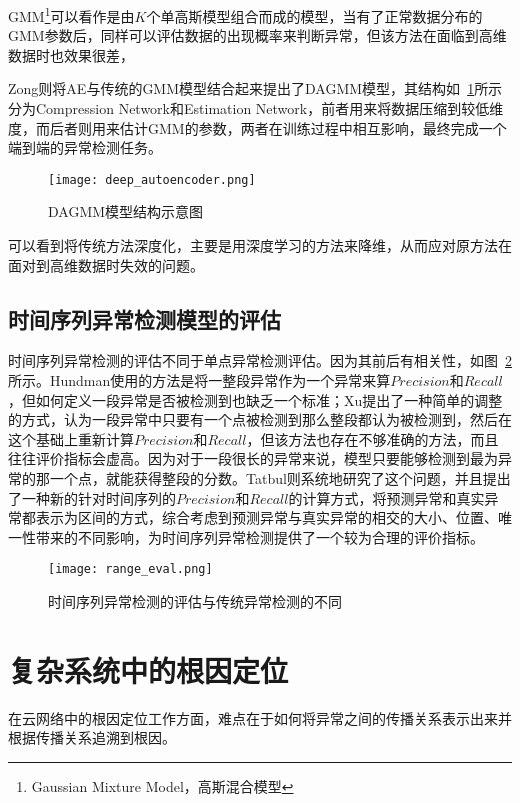 GMM\footnote{Gaussian Mixture Model，高斯混合模型}\cite{reynolds2009gaussian}可以看作是由$K$个单高斯模型组合而成的模型，当有了正常数据分布的GMM参数后，同样可以评估数据的出现概率来判断异常，但该方法在面临到高维数据时也效果很差，{Zong\cite{zong2018deep}则将AE与传统的GMM模型结合起来提出了DAGMM模型，其结构如~\ref{fig:deep:autoencoder}所示分为Compression Network和Estimation Network，前者用来将数据压缩到较低维度，而后者则用来估计GMM的参数，两者在训练过程中相互影响，最终完成一个端到端的异常检测任务。

\begin{figure}[htbp]
  \centering
  \texttt{[image: deep\_autoencoder.png]}
  \caption{DAGMM模型结构示意图\cite{malhotra2016lstm}}
  \label{fig:deep:autoencoder}
\end{figure}

可以看到将传统方法深度化，主要是用深度学习的方法来降维，从而应对原方法在面对到高维数据时失效的问题。

\subsection{时间序列异常检测模型的评估}
时间序列异常检测的评估不同于单点异常检测评估。因为其前后有相关性，如图~\ref{fig:range:eval}所示。Hundman\cite{DBLP:conf/kdd/HundmanCLCS18}使用的方法是将一整段异常作为一个异常来算$Precision$和$Recall$，但如何定义一段异常是否被检测到也缺乏一个标准；Xu\cite{xu2018unsupervised}提出了一种简单的调整的方式，认为一段异常中只要有一个点被检测到那么整段都认为被检测到，然后在这个基础上重新计算$Precision$和$Recall$，但该方法也存在不够准确的方法，而且往往评价指标会虚高。因为对于一段很长的异常来说，模型只要能够检测到最为异常的那一个点，就能获得整段的分数。Tatbul\cite{tatbul2018precision}则系统地研究了这个问题，并且提出了一种新的针对时间序列的$Precision$和$Recall$的计算方式，将预测异常和真实异常都表示为区间的方式，综合考虑到预测异常与真实异常的相交的大小、位置、唯一性带来的不同影响，为时间序列异常检测提供了一个较为合理的评价指标。
\begin{figure}[htbp]
    \centering
    \texttt{[image: range\_eval.png]}
    \caption{时间序列异常检测的评估与传统异常检测的不同\cite{tatbul2018precision}}
    \label{fig:range:eval}
  \end{figure}

\section{复杂系统中的根因定位}

在云网络中的根因定位工作方面，难点在于如何将异常之间的传播关系表示出来并根据传播关系追溯到根因。

}
